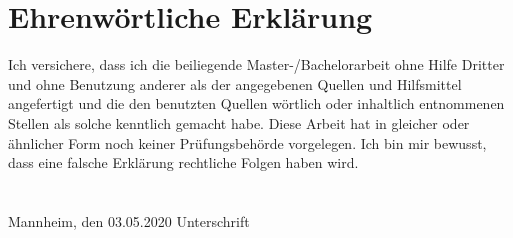 \pagestyle{empty}

\section*{Ehrenw\"ortliche Erkl\"arung}
Ich versichere, dass ich die beiliegende Master-/Bachelorarbeit ohne Hilfe Dritter
und ohne Benutzung anderer als der angegebenen Quellen und Hilfsmittel
angefertigt und die den benutzten Quellen w\"ortlich oder inhaltlich
entnommenen Stellen als solche kenntlich gemacht habe.
Diese Arbeit hat in gleicher oder \"ahnlicher Form noch keiner Pr\"ufungsbeh\"orde
vorgelegen.
Ich bin mir bewusst, dass eine falsche Erkl\"arung rechtliche Folgen haben wird.
\\
\\
\\
\noindent
Mannheim, den 03.05.2020 \hspace{4cm} Unterschrift